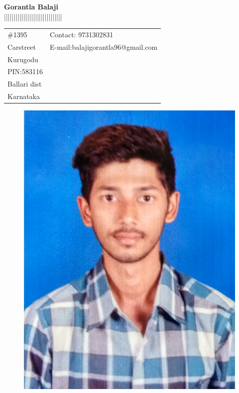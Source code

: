 \documentclass[10pt]{article}
\begin{document}
\huge{\textbf{\hspace{1.7in}Gorantla Balaji}} \\
||||||||||||||||||||||||||||||
\centering 
\thispagestyle{empty}
\large{\vspace{.05in}
\begin{tabular}{@{}p{3.5in}p{3in}}
\#1395            & \hspace{1.0cm} {Contact:}  9731302831 \\
Carstreet
 & \hspace{1cm}
  {E-mail:}\hspace{1.4mm}balajigorantla96@gmail.com\\
Kurugodu\\
PIN:583116 & {}\\
Ballari dist\\
Karnataka


\end{tabular}
}

 \begin{figure}[h]
\hspace{4.2in}\includegraphics[scale=0.05]{IMG_20170423_160215.jpg}
\end{figure}
\end{document}
